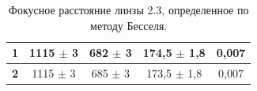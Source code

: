 \begin{table}[h]
\begin{tabular}{|c|c|c|c|c|}
\textbf{1}                                                          & 1115 $\pm$ 3                                                                                     & 682 $\pm$ 3                                                                                                  & 174,5 $\pm$ 1,8                                                                                                                  & 0,007                                                                                                                                                                \\ \hline
\textbf{2}                                                          & 1115 $\pm$ 3                                                                                     & 685 $\pm$ 3                                                                                                  & 173,5 $\pm$ 1,8                                                                                                                  & 0,007                                                                                                                                                                \\ \hline
\end{tabular}
\caption{Фокусное расстояние линзы 2.3, определенное по методу Бесселя.}
\label{tab:bessel}
\end{table}